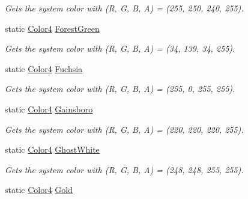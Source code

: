 \begin{DoxyCompactItemize}
\begin{DoxyCompactList}\small\item\em Gets the system color with (R, G, B, A) = (255, 250, 240, 255). \end{DoxyCompactList}\item 
static \hyperlink{struct_open_t_k_1_1_graphics_1_1_color4}{Color4} \hyperlink{struct_open_t_k_1_1_graphics_1_1_color4_a6006dd8d72d9fb266105d13df1f194bd}{Forest\-Green}
\begin{DoxyCompactList}\small\item\em Gets the system color with (R, G, B, A) = (34, 139, 34, 255). \end{DoxyCompactList}\item 
static \hyperlink{struct_open_t_k_1_1_graphics_1_1_color4}{Color4} \hyperlink{struct_open_t_k_1_1_graphics_1_1_color4_a557f6e1a943dc109404a56e67724e34d}{Fuchsia}
\begin{DoxyCompactList}\small\item\em Gets the system color with (R, G, B, A) = (255, 0, 255, 255). \end{DoxyCompactList}\item 
static \hyperlink{struct_open_t_k_1_1_graphics_1_1_color4}{Color4} \hyperlink{struct_open_t_k_1_1_graphics_1_1_color4_ae64cbff19f726db10e65784bfa7acdd9}{Gainsboro}
\begin{DoxyCompactList}\small\item\em Gets the system color with (R, G, B, A) = (220, 220, 220, 255). \end{DoxyCompactList}\item 
static \hyperlink{struct_open_t_k_1_1_graphics_1_1_color4}{Color4} \hyperlink{struct_open_t_k_1_1_graphics_1_1_color4_ae35519e478d170106a9c47861472833f}{Ghost\-White}
\begin{DoxyCompactList}\small\item\em Gets the system color with (R, G, B, A) = (248, 248, 255, 255). \end{DoxyCompactList}\item 
static \hyperlink{struct_open_t_k_1_1_graphics_1_1_color4}{Color4} \hyperlink{struct_open_t_k_1_1_graphics_1_1_color4_a24bf2835cecd41b83e0cdcaf1adb2338}{Gold}

\end{DoxyCompactItemize}
